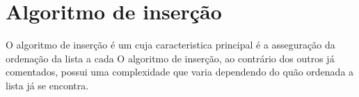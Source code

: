 \section{Algoritmo de inserção}
O algoritmo de inserção é um cuja caracteristica principal é a asseguração da ordenação da lista a cada 
O algoritmo de inserção, ao contrário dos outros já comentados, possui uma complexidade que varia dependendo do quão ordenada a lista já se encontra.